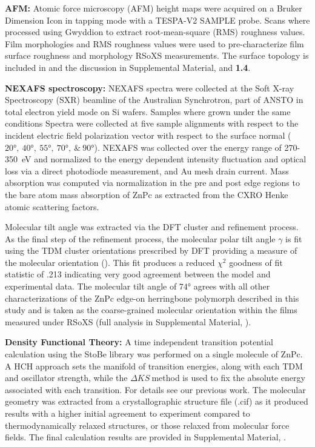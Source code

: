 \textbf{AFM:} Atomic force microscopy (AFM) height maps were acquired on a Bruker Dimension Icon in tapping mode with a TESPA-V2 SAMPLE probe. Scans where processed using Gwyddion\autocite{necasGwyddionOpensourceSoftware2012} to extract root-mean-square (RMS) roughness values. Film morphologies and RMS roughness values were used to pre-characterize film surface roughness and morphology RSoXS measurements. The surface topology is included in  and the discussion in Supplemental Material,  and \textbf{1.4}.

\textbf{NEXAFS spectroscopy:} NEXAFS spectra were collected at the Soft X-ray Spectroscopy (SXR) beamline of the Australian Synchrotron, part of ANSTO in total electron yield mode on Si wafers.\autocite{atlas_10_5281_zenodo_22742990} Samples where grown under the same conditions Spectra were collected at five sample alignments with respect to the incident electric field polarization vector with respect to the surface normal (\(\ang{20},\ \ang{40},\ \ang{55},\ \ang{70},\ \&\ \ang{90}\)). NEXAFS was collected over the energy range of 270-\qty{350}{eV} and normalized to the energy dependent intensity fluctuation and optical loss via a direct photodiode measurement, and Au mesh drain current. Mass absorption was computed via normalization in the pre and post edge regions to the bare atom mass absorption of ZnPc as extracted from the CXRO Henke atomic scattering factors.\autocite{henkeXRayInteractionsPhotoabsorption1993}

Molecular tilt angle was extracted via the DFT cluster and refinement process. As the final step of the refinement process, the molecular polar tilt angle \(\gamma\) is fit using the TDM cluster orientations prescribed by DFT providing a measure of the molecular orientation (). This fit produces a reduced \(\chi^{2}\) goodness of fit statistic of .213 indicating very good agreement between the model and experimental data. The molecular tilt angle of \(\ang{74}\) agrees with all other characterizations of the ZnPc edge-on herringbone polymorph described in this study and is taken as the coarse-grained molecular orientation within the films measured under RSoXS (full analysis in Supplemental Material, ).

\textbf{Density Functional Theory:} A time independent transition potential calculation using the StoBe library was performed on a single molecule of ZnPc. A HCH approach sets the manifold of transition energies, along with each TDM and oscillator strength, while the \(\Delta KS\ \)method is used to fix the absolute energy associated with each transition. For details see our previous work.\autocite{murciaQuantitativeBondTraceableResonant2026} The molecular geometry was extracted from a crystallographic structure file (.cif)\autocite{maiDataDensityFunction2020} as it produced results with a higher initial agreement to experiment compared to thermodynamically relaxed structures, or those relaxed from molecular force fields. The final calculation results are provided in Supplemental Material, .


